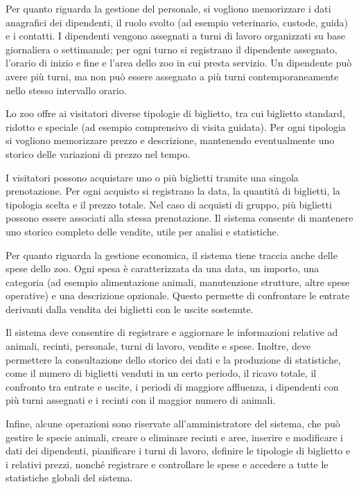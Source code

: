 \documentclass[12pt,a4paper]{report}
\begin{document}
Per quanto riguarda la gestione del personale, si vogliono memorizzare i dati anagrafici dei dipendenti, il ruolo svolto (ad esempio veterinario, custode, guida) e i contatti. I dipendenti vengono assegnati a turni di lavoro organizzati su base giornaliera o settimanale; per ogni turno si registrano il dipendente assegnato, l’orario di inizio e fine e l’area dello zoo in cui presta servizio. Un dipendente può avere più turni, ma non può essere assegnato a più turni contemporaneamente nello stesso intervallo orario. 

Lo zoo offre ai visitatori diverse tipologie di biglietto, tra cui biglietto standard, ridotto e speciale (ad esempio comprensivo di visita guidata). Per ogni tipologia si vogliono memorizzare prezzo e descrizione, mantenendo eventualmente uno storico delle variazioni di prezzo nel tempo. 

I visitatori possono acquistare uno o più biglietti tramite una singola prenotazione. Per ogni acquisto si registrano la data, la quantità di biglietti, la tipologia scelta e il prezzo totale. Nel caso di acquisti di gruppo, più biglietti possono essere associati alla stessa prenotazione. Il sistema consente di mantenere uno storico completo delle vendite, utile per analisi e statistiche. 

Per quanto riguarda la gestione economica, il sistema tiene traccia anche delle spese dello zoo. Ogni spesa è caratterizzata da una data, un importo, una categoria (ad esempio alimentazione animali, manutenzione strutture, altre spese operative) e una descrizione opzionale. Questo permette di confrontare le entrate derivanti dalla vendita dei biglietti con le uscite sostenute. 

Il sistema deve consentire di registrare e aggiornare le informazioni relative ad animali, recinti, personale, turni di lavoro, vendite e spese. Inoltre, deve permettere la consultazione dello storico dei dati e la produzione di statistiche, come il numero di biglietti venduti in un certo periodo, il ricavo totale, il confronto tra entrate e uscite, i periodi di maggiore affluenza, i dipendenti con più turni assegnati e i recinti con il maggior numero di animali. 

Infine, alcune operazioni sono riservate all’amministratore del sistema, che può gestire le specie animali, creare o eliminare recinti e aree, inserire e modificare i dati dei dipendenti, pianificare i turni di lavoro, definire le tipologie di biglietto e i relativi prezzi, nonché registrare e controllare le spese e accedere a tutte le statistiche globali del sistema. 
\end{document}
